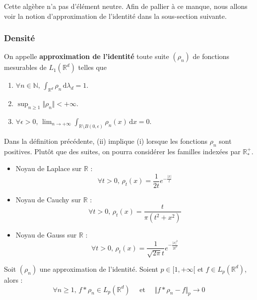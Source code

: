 	\begin{remark}
		Cette algèbre n'a pas d'élément neutre. Afin de pallier à ce manque, nous allons voir la notion d'approximation de l'identité dans la sous-section suivante.
	\end{remark}

	\subsubsection{Densité}


	\begin{definition}
		On appelle \textbf{approximation de l'identité} toute suite $(\rho_n)$ de fonctions mesurables de $L_1(\mathbb{R}^d)$ telles que
		\begin{enumerate}[label=(\roman*)]
			\item $\forall n \in \mathbb{N}, \, \int_{\mathbb{R}^d} \rho_n \, \mathrm{d}\lambda_d = 1$.
			\item $\sup_{n \geq 1} \Vert \rho_n \Vert < +\infty$.
			\item $\forall \epsilon > 0, \, \lim_{n \rightarrow +\infty} \int_{\mathbb{R} \setminus B(0, \epsilon)} \rho_n(x) \, \mathrm{d}x = 0$.
		\end{enumerate}
	\end{definition}

	\begin{remark}
		Dans la définition précédente, (ii) implique (i) lorsque les fonctions $\rho_n$ sont positives. Plutôt que des suites, on pourra considérer les familles indexées par $\mathbb{R}_*^+$.
	\end{remark}

	\begin{example}
		\begin{itemize}
			\item Noyau de Laplace sur $\mathbb{R}$ :
			\[ \forall t > 0, \, \rho_t(x) = \frac{1}{2t}e^{-\frac{|x|}{t}} \]
			\item Noyau de Cauchy sur $\mathbb{R}$ :
			\[ \forall t > 0, \, \rho_t(x) = \frac{t}{\pi (t^2 + x^2)} \]
			\item Noyau de Gauss sur $\mathbb{R}$ :
			\[ \forall t > 0, \, \rho_t(x) = \frac{1}{\sqrt{2\pi} t}e^{-\frac{|x|^2}{2t^2}} \]
		\end{itemize}
	\end{example}


	\begin{theorem}
		Soit $(\rho_n)$ une approximation de l'identité. Soient $p \in [1, +\infty[$ et $f \in L_p(\mathbb{R}^d)$, alors :
		\[ \forall n \geq 1, \, f * \rho_n \in L_p(\mathbb{R}^d) \quad \text{ et } \quad \Vert f * \rho_n - f \Vert_p \longrightarrow 0 \]
	\end{theorem}

